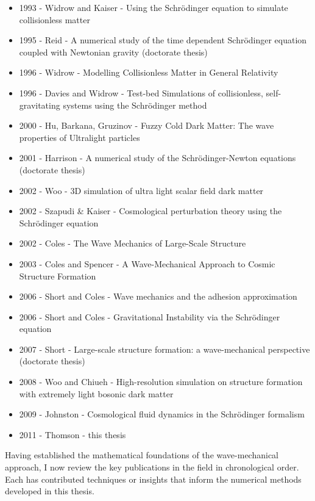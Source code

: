 \begin{itemize}
\item 1993 - Widrow and Kaiser - Using the Schr\"odinger equation to simulate collisionless matter
\item 1995 - Reid - A numerical study of the time dependent Schr\"odinger equation coupled with Newtonian gravity (doctorate thesis)
\item 1996 - Widrow - Modelling Collisionless Matter in General Relativity
\item 1996 - Davies and Widrow - Test-bed Simulations of collisionless, self-gravitating systems using the Schr\"odinger method
\item 2000 - Hu, Barkana, Gruzinov - Fuzzy Cold Dark Matter: The wave properties of Ultralight particles
\item 2001 - Harrison - A numerical study of the Schr\"odinger-Newton equations (doctorate thesis)
\item 2002 - Woo - 3D simulation of ultra light scalar field dark matter
\item 2002 - Szapudi \& Kaiser - Cosmological perturbation theory using the Schr\"odinger equation
\item 2002 - Coles - The Wave Mechanics of Large-Scale Structure
\item 2003 - Coles and Spencer - A Wave-Mechanical Approach to Cosmic Structure Formation
\item 2006 - Short and Coles - Wave mechanics and the adhesion approximation
\item 2006 - Short and Coles - Gravitational Instability via the Schr\"odinger equation
\item 2007 - Short - Large-scale structure formation: a wave-mechanical perspective (doctorate thesis)
\item 2008 - Woo and Chiueh - High-resolution simulation on structure formation with extremely light bosonic dark matter
\item 2009 - Johnston - Cosmological fluid dynamics in the Schr\"odinger formalism
\item 2011 - Thomson - this thesis
\end{itemize}

\noindent Having established the mathematical foundations of the wave-mechanical approach, I now review the key publications in the field in chronological order. Each has contributed techniques or insights that inform the numerical methods developed in this thesis.


